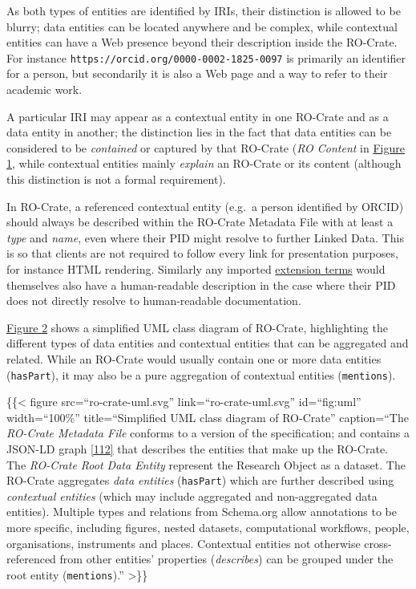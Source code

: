 As both types of entities are identified by IRIs, their distinction is
allowed to be blurry; data entities can be located anywhere and be
complex, while contextual entities can have a Web presence beyond their
description inside the RO-Crate. For instance
\texttt{https://orcid.org/0000-0002-1825-0097} is primarily an
identifier for a person, but secondarily it is also a Web page and a way
to refer to their academic work.

A particular IRI may appear as a contextual entity in one RO-Crate and
as a data entity in another; the distinction lies in the fact that data
entities can be considered to be \emph{contained} or captured by that
RO-Crate (\emph{RO Content} in \protect\hyperlink{fig:conceptual}{Figure
1}, while contextual entities mainly \emph{explain} an RO-Crate or its
content (although this distinction is not a formal requirement).

In RO-Crate, a referenced contextual entity (e.g.~a person identified by
ORCID) should always be described within the RO-Crate Metadata File with
at least a \emph{type} and \emph{name}, even where their PID might
resolve to further Linked Data. This is so that clients are not required
to follow every link for presentation purposes, for instance HTML
rendering. Similarly any imported
\href{https://www.researchobject.org/ro-crate/1.1/appendix/jsonld.html\#extending-ro-crate}{extension
terms} would themselves also have a human-readable description in the
case where their PID does not directly resolve to human-readable
documentation.

\protect\hyperlink{fig:uml}{Figure 2} shows a simplified UML class
diagram of RO-Crate, highlighting the different types of data entities
and contextual entities that can be aggregated and related. While an
RO-Crate would usually contain one or more data entities
(\texttt{hasPart}), it may also be a pure aggregation of contextual
entities (\texttt{mentions}).

\{\{\textless{} figure src=``ro-crate-uml.svg''
link=``ro-crate-uml.svg'' id=``fig:uml'' width=``100\%''
title=``Simplified UML class diagram of RO-Crate'' caption=``The
\emph{RO-Crate Metadata File} conforms to a version of the
specification; and contains a JSON-LD graph
\href{https://www.w3.org/TR/2014/REC-json-ld-20140116/}{{[}112{]}} that
describes the entities that make up the RO-Crate. The \emph{RO-Crate
Root Data Entity} represent the Research Object as a dataset. The
RO-Crate aggregates \emph{data entities} (\texttt{hasPart}) which are
further described using \emph{contextual entities} (which may include
aggregated and non-aggregated data entities). Multiple types and
relations from Schema.org allow annotations to be more specific,
including figures, nested datasets, computational workflows, people,
organisations, instruments and places. Contextual entities not otherwise
cross-referenced from other entities' properties (\emph{describes}) can
be grouped under the root entity (\texttt{mentions}).'' \textgreater\}\}

